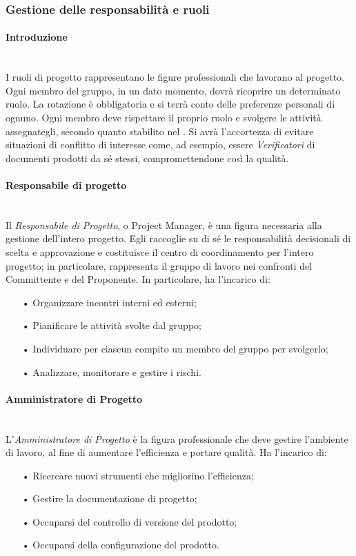 \subsubsection{Gestione delle responsabilità e ruoli}

\paragraph{Introduzione} \mbox{}\\
I ruoli di progetto rappresentano le figure professionali che lavorano al progetto. Ogni membro del gruppo, in un dato momento, dovrà ricoprire un determinato ruolo.  
\newline
La rotazione è obbligatoria e si terrà conto delle preferenze personali di ognuno. Ogni membro deve rispettare il proprio ruolo e svolgere le attività assegnategli, secondo quanto stabilito nel \PdP. Si avrà l'accortezza di evitare situazioni di conflitto di interesse come, ad esempio, essere \textit{Verificatori} di documenti prodotti da sé stessi, compromettendone così la qualità.

\paragraph{Responsabile di progetto} \mbox{}\\
Il \textit{Responsabile di Progetto}, o Project Manager, è una figura necessaria alla gestione dell'intero progetto. Egli raccoglie su di sé le responsabilità decisionali di scelta e approvazione e costituisce il centro di coordinamento per l'intero progetto; in particolare, rappresenta il gruppo di lavoro nei confronti del Committente e del Proponente. 
\newline
In particolare, ha l'incarico di:
\begin{itemize}
\item[•] Organizzare incontri interni ed esterni;
\item[•] Pianificare le attività svolte dal gruppo;
\item[•] Individuare per ciascun compito un membro del gruppo per svolgerlo;
\item[•] Analizzare, monitorare e gestire i rischi.
\end{itemize}

\paragraph{Amministratore di Progetto} \mbox{}\\
L’\textit{Amministratore di Progetto} è la figura professionale che deve gestire l’ambiente di lavoro, al fine di aumentare l'efficienza e portare qualità. 
\newline
Ha l'incarico di:
\begin{itemize}
\item[•] Ricercare nuovi strumenti che migliorino l'efficienza;
\item[•] Gestire la documentazione di progetto;
\item[•] Occuparsi del controllo di versione del prodotto;
\item[•] Occuparsi della configurazione del prodotto.
\end{itemize}


